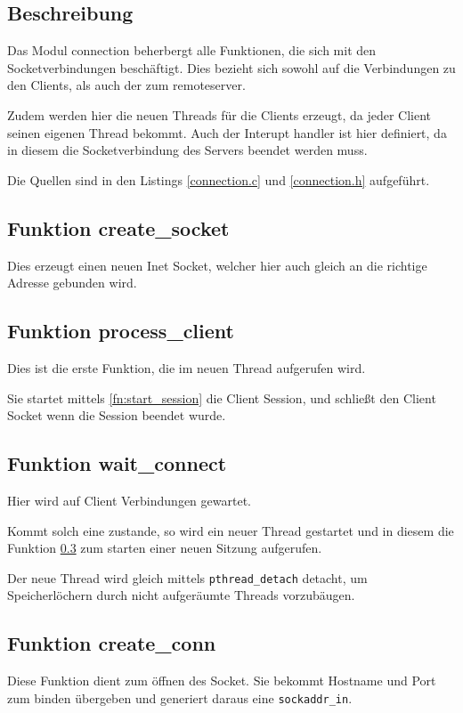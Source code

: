 \documentclass[pdftex,final,a4paper,10pt,notitlepage,halfparskip]{scrreprt}
\begin{document}
\subsection{Beschreibung}
Das Modul connection beherbergt alle Funktionen, die sich mit den Socketverbindungen beschäftigt. Dies bezieht sich sowohl auf die Verbindungen zu den Clients, als auch der zum remoteserver.

Zudem werden hier die neuen Threads für die Clients erzeugt, da jeder Client seinen eigenen Thread bekommt. Auch der Interupt handler ist hier definiert, da in diesem die Socketverbindung des Servers beendet werden muss.

Die Quellen sind in den Listings \ref{connection.c} und \ref{connection.h} aufgeführt.




\subsection{Funktion create\_socket}\label{fn:create_socket}
Dies erzeugt einen neuen Inet Socket, welcher hier auch gleich an die richtige Adresse gebunden wird.

\subsection{Funktion process\_client}\label{fn:process_client}
Dies ist die erste Funktion, die im neuen Thread aufgerufen wird.

Sie startet mittels \ref{fn:start_session} die Client Session, und schließt den Client Socket wenn die Session beendet wurde.

\subsection{Funktion wait\_connect}\label{fn:wait_connect}
Hier wird auf Client Verbindungen gewartet. 

Kommt solch eine zustande, so wird ein neuer Thread gestartet und in diesem die Funktion \ref{fn:process_client} zum starten einer neuen Sitzung aufgerufen.

Der neue Thread wird gleich mittels \texttt{pthread\_detach} detacht, um Speicherlöchern durch nicht aufgeräumte Threads vorzubäugen.

\subsection{Funktion create\_conn}\label{fn:create_conn}
Diese Funktion dient zum öffnen des Socket. Sie bekommt Hostname und Port zum binden übergeben und generiert daraus eine \texttt{sockaddr\_in}.
\end{document}
